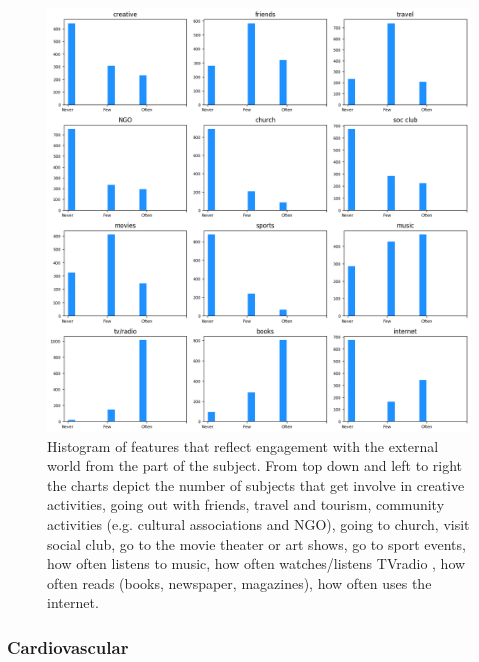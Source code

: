 \documentclass[11pt]{article}
\theoremstyle{definition}
\theoremstyle{remark}
\begin{document}
\begin{figure}[H]
        \centering
        \includegraphics[keepaspectratio, width=\linewidth]{figures/Fig_engage}
        \caption{Histogram of features that reflect engagement with the external world from the part of the subject. From top down and left to right the charts depict the number of subjects that get involve in creative activities, going out with friends, travel and tourism, community activities (e.g. cultural associations and NGO), going to church, visit social club, go to the movie theater or art shows, go to sport events, how often listens to music, how often watches/listens TVradio , how often reads (books, newspaper, magazines), how often uses the internet.} 
        \label{fig:engage}
\end{figure}

\subsubsection{Cardiovascular}
\label{ssse:cardio}
\end{document}
